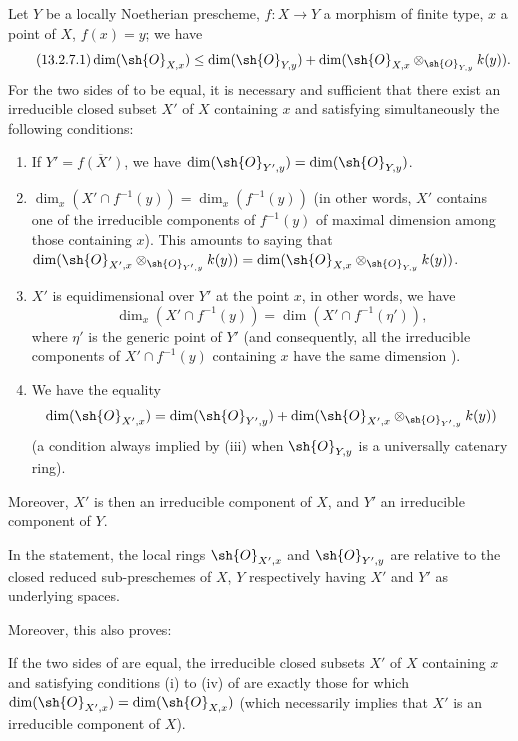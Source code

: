 \begin{proposition}[13.2.7]
\label{IV.13.2.7}
Let $Y$ be a locally Noetherian prescheme, $f:X\to Y$ a morphism of finite type, $x$ a point of $X$, $f(x)=y$; we have
\[
\tag{13.2.7.1}
\label{IV.13.2.7.1}
  \dim(\sh{O}_{X,x})\leq\dim(\sh{O}_{Y,y})+\dim(\sh{O}_{X,x}\otimes_{\sh{O}_{Y,y}}k(y)).
\]
For the two sides of  to be equal, it is necessary and sufficient that there exist an irreducible closed subset $X'$ of $X$ containing $x$ and satisfying simultaneously the following conditions:
\begin{enumerate}[label=(\roman*)]
  \item If $Y'=\overline{f(X')}$, we have $\dim(\sh{O}_{Y',y})=\dim(\sh{O}_{Y,y})$.
  \item $\dim_x(X'\cap f^{-1}(y))=\dim_x(f^{-1}(y))$ (in other words, $X'$ contains one of the irreducible components of $f^{-1}(y)$ of maximal dimension among those containing $x$). This amounts to saying that $\dim(\sh{O}_{X',x}\otimes_{\sh{O}_{Y',y}}k(y))=\dim(\sh{O}_{X,x}\otimes_{\sh{O}_{Y,y}}k(y))$.
  \item $X'$ is equidimensional over $Y'$ at the point $x$, in other words, we have
  \[
    \dim_x(X'\cap f^{-1}(y))=\dim(X'\cap f^{-1}(\eta')),
  \]
  where $\eta'$ is the generic point of $Y'$ (and consequently, all the irreducible components of $X'\cap f^{-1}(y)$ containing $x$ have the same dimension ).
  \item We have the equality
  \[
    \dim(\sh{O}_{X',x})=\dim(\sh{O}_{Y',y})+\dim(\sh{O}_{X',x}\otimes_{\sh{O}_{Y',y}}k(y))
  \]
  (a condition always implied by (iii) when $\sh{O}_{Y,y}$ is a universally catenary ring).
\end{enumerate}
Moreover, $X'$ is then an irreducible component of $X$, and $Y'$ an irreducible component of $Y$.
\end{proposition}

In the statement, the local rings $\sh{O}_{X',x}$ and $\sh{O}_{Y',y}$ are relative to the closed reduced sub-preschemes of $X$, $Y$ respectively having $X'$ and $Y'$ as underlying spaces.

Moreover, this also proves:

\begin{corollary}[13.2.8]
\label{IV.13.2.8}
If the two sides of  are equal, the irreducible closed subsets $X'$ of $X$ containing $x$ and satisfying conditions (i) to (iv) of  are exactly those for which $\dim(\sh{O}_{X',x})=\dim(\sh{O}_{X,x})$ (which necessarily implies that $X'$ is an irreducible component of $X$).
\end{corollary}

